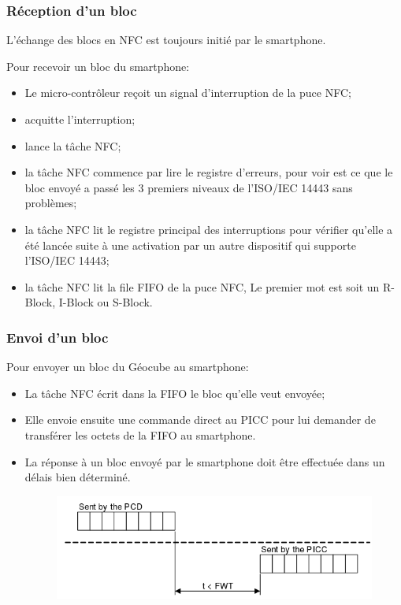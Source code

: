 \documentclass{beamer}
\begin{document}
\begin{frame}
\frametitle{Réception d'un bloc}
L'échange des blocs en NFC est toujours initié par le smartphone.

Pour recevoir un bloc du smartphone:
\begin{itemize}
\item Le micro-contrôleur reçoit un signal d'interruption de la puce NFC;
\item acquitte l'interruption;
\item lance la tâche NFC;
\item la tâche NFC commence par lire le registre d'erreurs, pour voir est ce que le bloc envoyé a passé les 3 premiers niveaux de l'ISO/IEC 14443 sans problèmes;
\item la tâche NFC lit le registre principal des interruptions pour vérifier qu'elle a été lancée suite à une activation par un autre dispositif qui supporte l'ISO/IEC 14443;
\item la tâche NFC lit la file FIFO de la puce NFC, Le premier mot est soit un R-Block, I-Block ou S-Block.
\end{itemize}

\end{frame}

\begin{frame}
\frametitle{Envoi d'un bloc}
Pour envoyer un bloc du Géocube au smartphone:
\begin{itemize}
\item La tâche NFC écrit dans la FIFO le bloc qu'elle veut envoyée;
\item Elle envoie ensuite une commande direct au PICC pour lui demander de transférer les octets de la FIFO au smartphone.
\item La réponse à un bloc envoyé par le smartphone doit être effectuée dans un délais bien déterminé.

\begin{figure}
\centering
\includegraphics[scale=0.45]{images/fwt.png}
\end{figure}

\end{itemize}
\end{frame}
\end{document}
